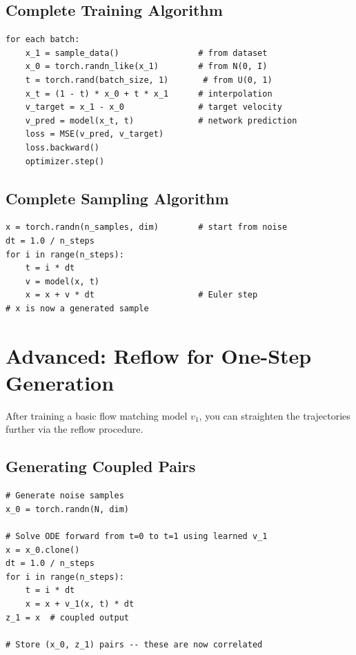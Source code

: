 \documentclass[11pt, a4paper]{article}
\begin{document}
\subsection{Complete Training Algorithm}

\begin{tcolorbox}[colback=codebg, colframe=codeframe, title=\textbf{Algorithm 1: Flow Matching Training}]
\begin{lstlisting}
for each batch:
    x_1 = sample_data()                # from dataset
    x_0 = torch.randn_like(x_1)        # from N(0, I)
    t = torch.rand(batch_size, 1)       # from U(0, 1)
    x_t = (1 - t) * x_0 + t * x_1      # interpolation
    v_target = x_1 - x_0               # target velocity
    v_pred = model(x_t, t)             # network prediction
    loss = MSE(v_pred, v_target)
    loss.backward()
    optimizer.step()
\end{lstlisting}
\end{tcolorbox}

\subsection{Complete Sampling Algorithm}

\begin{tcolorbox}[colback=codebg, colframe=codeframe, title=\textbf{Algorithm 2: Flow Matching Sampling (Euler)}]
\begin{lstlisting}
x = torch.randn(n_samples, dim)        # start from noise
dt = 1.0 / n_steps
for i in range(n_steps):
    t = i * dt
    v = model(x, t)
    x = x + v * dt                     # Euler step
# x is now a generated sample
\end{lstlisting}
\end{tcolorbox}

\section{Advanced: Reflow for One-Step Generation}
\label{sec:reflow}

After training a basic flow matching model $v_1$, you can straighten the
trajectories further via the reflow procedure.

\subsection{Generating Coupled Pairs}

\begin{tcolorbox}[colback=codebg, colframe=codeframe, title=\textbf{Step 1: Generate coupled pairs using $v_1$}]
\begin{lstlisting}
# Generate noise samples
x_0 = torch.randn(N, dim)

# Solve ODE forward from t=0 to t=1 using learned v_1
x = x_0.clone()
dt = 1.0 / n_steps
for i in range(n_steps):
    t = i * dt
    x = x + v_1(x, t) * dt
z_1 = x  # coupled output

# Store (x_0, z_1) pairs -- these are now correlated
\end{lstlisting}
\end{tcolorbox}
\end{document}
